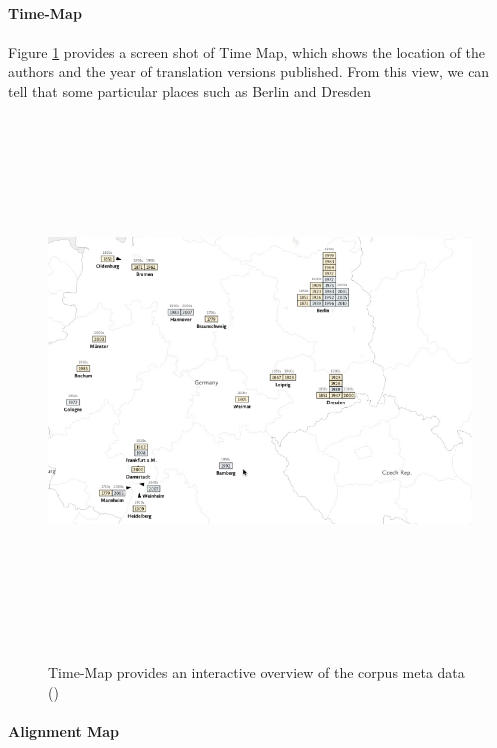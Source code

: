 \paragraph{Time-Map}
\paragraph[]{}

Figure \ref{fig:timeMap} provides a screen shot of Time Map, which shows the location of the authors and the year of translation versions published. From this view, we can tell that some particular places such as Berlin and Dresden

\begin{figure}[h] 
	\centering	
	\includegraphics[width=16cm, height=14cm]{Figs/Time-Map}\\[1ex]
	\caption{Time-Map provides an interactive overview of the corpus meta data (\cite{Cheesman2012})}
	\label{fig:timeMap}
\end{figure} 

\paragraph{Alignment Map}
\paragraph[]{}

